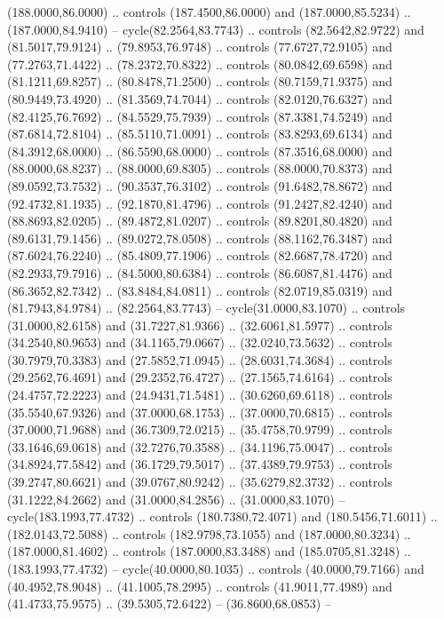   (188.0000,86.0000) .. controls (187.4500,86.0000) and (187.0000,85.5234) ..
  (187.0000,84.9410) -- cycle(82.2564,83.7743) .. controls (82.5642,82.9722) and
  (81.5017,79.9124) .. (79.8953,76.9748) .. controls (77.6727,72.9105) and
  (77.2763,71.4422) .. (78.2372,70.8322) .. controls (80.0842,69.6598) and
  (81.1211,69.8257) .. (80.8478,71.2500) .. controls (80.7159,71.9375) and
  (80.9449,73.4920) .. (81.3569,74.7044) .. controls (82.0120,76.6327) and
  (82.4125,76.7692) .. (84.5529,75.7939) .. controls (87.3381,74.5249) and
  (87.6814,72.8104) .. (85.5110,71.0091) .. controls (83.8293,69.6134) and
  (84.3912,68.0000) .. (86.5590,68.0000) .. controls (87.3516,68.0000) and
  (88.0000,68.8237) .. (88.0000,69.8305) .. controls (88.0000,70.8373) and
  (89.0592,73.7532) .. (90.3537,76.3102) .. controls (91.6482,78.8672) and
  (92.4732,81.1935) .. (92.1870,81.4796) .. controls (91.2427,82.4240) and
  (88.8693,82.0205) .. (89.4872,81.0207) .. controls (89.8201,80.4820) and
  (89.6131,79.1456) .. (89.0272,78.0508) .. controls (88.1162,76.3487) and
  (87.6024,76.2240) .. (85.4809,77.1906) .. controls (82.6687,78.4720) and
  (82.2933,79.7916) .. (84.5000,80.6384) .. controls (86.6087,81.4476) and
  (86.3652,82.7342) .. (83.8484,84.0811) .. controls (82.0719,85.0319) and
  (81.7943,84.9784) .. (82.2564,83.7743) -- cycle(31.0000,83.1070) .. controls
  (31.0000,82.6158) and (31.7227,81.9366) .. (32.6061,81.5977) .. controls
  (34.2540,80.9653) and (34.1165,79.0667) .. (32.0240,73.5632) .. controls
  (30.7979,70.3383) and (27.5852,71.0945) .. (28.6031,74.3684) .. controls
  (29.2562,76.4691) and (29.2352,76.4727) .. (27.1565,74.6164) .. controls
  (24.4757,72.2223) and (24.9431,71.5481) .. (30.6260,69.6118) .. controls
  (35.5540,67.9326) and (37.0000,68.1753) .. (37.0000,70.6815) .. controls
  (37.0000,71.9688) and (36.7309,72.0215) .. (35.4758,70.9799) .. controls
  (33.1646,69.0618) and (32.7276,70.3588) .. (34.1196,75.0047) .. controls
  (34.8924,77.5842) and (36.1729,79.5017) .. (37.4389,79.9753) .. controls
  (39.2747,80.6621) and (39.0767,80.9242) .. (35.6279,82.3732) .. controls
  (31.1222,84.2662) and (31.0000,84.2856) .. (31.0000,83.1070) --
  cycle(183.1993,77.4732) .. controls (180.7380,72.4071) and (180.5456,71.6011)
  .. (182.0143,72.5088) .. controls (182.9798,73.1055) and (187.0000,80.3234) ..
  (187.0000,81.4602) .. controls (187.0000,83.3488) and (185.0705,81.3248) ..
  (183.1993,77.4732) -- cycle(40.0000,80.1035) .. controls (40.0000,79.7166) and
  (40.4952,78.9048) .. (41.1005,78.2995) .. controls (41.9011,77.4989) and
  (41.4733,75.9575) .. (39.5305,72.6422) -- (36.8600,68.0853) --
